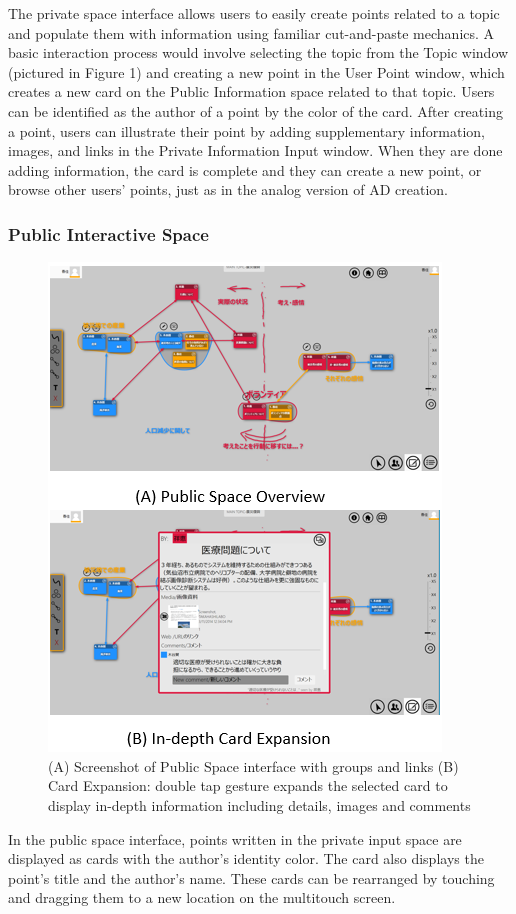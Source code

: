 \documentclass{sigchi}
\begin{document}
\begin{itemize}
The private space interface allows users to easily create points related to a topic and populate them with information using familiar cut-and-paste mechanics. A basic interaction process would involve selecting the topic from the Topic window (pictured in Figure 1) and creating a new point in the User Point window, which creates a new card on the Public Information space related to that topic. Users can be identified as the author of a point by the color of the card. After creating a point, users can illustrate their point by adding supplementary information, images, and links in the Private Information Input window. When they are done adding information, the card is complete and they can create a new point, or browse other users' points, just as in the analog version of AD creation.

\subsubsection{Public Interactive Space}

\begin{figure}[!h]
\centering
\includegraphics[width=1.0\columnwidth]{public4}
\caption{(A) Screenshot of Public Space interface with groups and links (B) Card Expansion: double tap gesture expands the selected card to display in-depth information including details, images and comments}
\label{fig:figure1}
\end{figure}
In the public space interface, points written in the private input space are displayed as cards with the author's identity color. The card also displays the point's title and the author's name. These cards can be rearranged by touching and dragging them to a new location on the multitouch screen.


\end{itemize}
\end{document}
